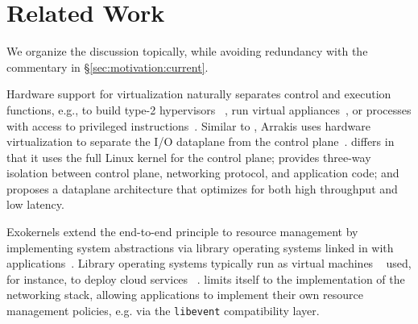 

\section{Related Work}
\label{sec:related}

We organize the discussion topically, while avoiding redundancy with
the commentary in \S\ref{sec:motivation:current}.

 Hardware support for
virtualization naturally separates control and execution functions,
e.g., to build type-2 hypervisors
~\cite{DBLP:journals/tocs/BugnionDRSW12,misc/kivity07kvm}, run virtual
appliances~\cite{DBLP:conf/lisa/SapuntzakisBCZCLR03}, or processes
with access to privileged instructions~\cite{dune}. Similar to \ix,
Arrakis uses hardware virtualization to separate the I/O dataplane
from the control plane~\cite{arrakis-osdi}. \ix differs in that it
uses the full Linux kernel for the control plane; provides three-way
isolation between control plane, networking protocol, and application
code; and proposes a dataplane architecture that optimizes for both
high throughput and low latency. 

 Exokernels extend the
end-to-end principle to resource management by implementing system
abstractions via library operating systems linked in with
applications~\cite{DBLP:conf/sosp/EnglerKO95}.  Library operating
systems typically run as virtual machines
~\cite{DBLP:journals/tocs/BugnionDGR97} used, for instance, to deploy
cloud services ~\cite{DBLP:conf/asplos/MadhavapeddyMRSSGSHC13}. \ix
limits itself to the implementation of the networking stack, allowing
applications to implement their own resource management policies,
e.g. via the \texttt{libevent} compatibility layer.

\begin{comment}
  \myparagraph{User-level networking stacks:} User-level network
  stacks~\cite{jeong2014mtcp, sandstorm, openonload} can outperform
  kernel-based implementations through specialization and elimination
  of redundant layers and abstractions, but trade-off performance for
  a weaker security model.  The \ix dataplane demonstrates that a
  specialized networking stack can offer performance and cooperate
  with applications without having to weaken security and isolation
  properties.
 
  \myparagraph{Hardware and protocol specialization:} Applications can
  use a connection-less UDP-based protocol for
  scalability~\cite{DBLP:conf/nsdi/NishtalaFGKLLMPPSSTV13}.
  Latency-sensitive datacenter applications can use specialized
  Infiniband adapters to expose RDMA with $1-3$\microsecond latencies
  to
  applications~\cite{dragojevic14farm,DBLP:conf/icpp/JoseSLZHWIOWSP11,
    mitchell:rdma, DBLP:conf/sosp/OngaroRSOR11}.  Specialized FGPAs
  can replace conventional servers for important applications such as
  memcached~\cite{DBLP:conf/hotcloud/BlottKLVBI13,DBLP:conf/fpga/ChalamalasettiLWARM13,HPHA:Tanaka:2014}.
  \ix is designed to allow TCP/IP to scale with architectural trends
  by eliminating kernel bottlenecks.
\end{comment}


